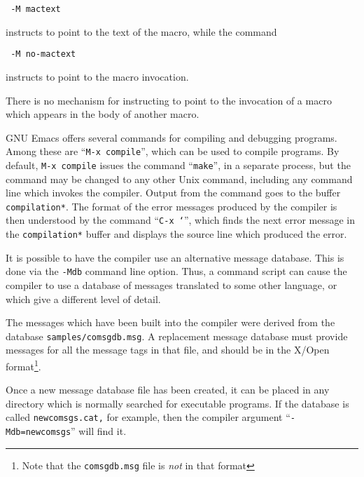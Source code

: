 {\small
{\tt \asharpcmd{} -M mactext}
}

instructs
\asharpcmd{} to point to the text of the macro, while the command

{\small
{\tt \asharpcmd{} -M no-mactext}
}

instructs \asharpcmd{} to point to the macro invocation.

There is no mechanism for instructing \asharpcmd{} to point to the
invocation of a macro which appears in the body of another macro.


GNU Emacs offers several commands for compiling and debugging
programs.
Among these are ``{\tt M-x compile}'', which can be used to compile
\asharp{} programs.
By default, {\tt M-x compile} issues the command ``{\tt make}'', in a
separate process, but the command may be changed to any other Unix
command, including any command line which invokes the \asharp{}
compiler.
Output from the command goes to the buffer {\tt *compilation*}.
The format of the error messages produced by the \asharp{} compiler
is then understood by the command ``{\tt C-x `}'', which finds the
next error message in the {\tt *compilation*} buffer and displays
the source line which produced the error.


It is possible to have the \asharp{} compiler use an alternative
message database.
This is done via the {\tt -Mdb} command line option.
Thus, a command script can cause the compiler to use a database of
messages translated to some other language, or which give a
different level of detail.

The messages which have been built into the compiler were derived
from the database {\tt samples/comsgdb.msg}.
A replacement message database must provide messages for all the
message tags in that file, and should 
be in the X/Open format\footnote{Note that
the {\tt comsgdb.msg} file is {\em not} in that format}.

Once a new message database file has been created, it can be
placed in any directory which is normally searched for executable
programs.
If the database is called {\tt newcomsgs.cat,} for example, then
the compiler argument ``{\tt -Mdb=newcomsgs}'' will find it.
